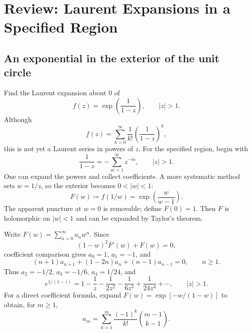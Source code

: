 \documentclass[11pt,a4paper]{article}
\theoremstyle{definition}
\theoremstyle{plain}
\begin{document}
\section{Review: Laurent Expansions in a Specified Region}
\subsection{An exponential in the exterior of the unit circle}
Find the Laurent expansion about $0$ of
\begin{equation}\label{eq:04}
f(z)=\exp\left(\frac1{1-z}\right),\qquad |z|>1.
\end{equation}
Although
\begin{equation}\label{eq:05}
f(z)=\sum_{k=0}^{\infty}\frac1{k!}\left(\frac1{1-z}\right)^k,
\end{equation}
this is not yet a Laurent series in powers of $z$. For the specified
region, begin with
\begin{equation}\label{eq:06}
\frac1{1-z}=-\sum_{m=1}^{\infty}z^{-m},\qquad |z|>1.
\end{equation}
One can expand the powers and collect coefficients. A more systematic
method sets $w=1/z$, so the exterior becomes $0<|w|<1$:
\begin{equation}\label{eq:07}
F(w)\coloneqq f(1/w)=\exp\left(\frac w{w-1}\right).
\end{equation}
The apparent puncture at $w=0$ is removable; define $F(0)=1$. Then $F$
is holomorphic on $|w|<1$ and can be expanded by Taylor's theorem.

Write $F(w)=\sum_{n=0}^{\infty}a_nw^n$. Since
\begin{equation}\label{eq:08}
(1-w)^2 F'(w)+F(w)=0,
\end{equation}
coefficient comparison gives $a_0=1$, $a_1=-1$, and
\begin{equation}\label{eq:09}
(n+1)a_{n+1}+(1-2n)a_n+(n-1)a_{n-1}=0,\qquad n\geq1.
\end{equation}
Thus $a_2=-1/2$, $a_3=-1/6$, $a_4=1/24$, and
\begin{equation}\label{eq:10}
\boxed{e^{1/(1-z)}
   =1-\frac1z-\frac1{2z^2}-\frac1{6z^3}
        +\frac1{24z^4}+\cdots,\qquad |z|>1.}
\end{equation}
For a direct coefficient formula, expand
$F(w)=\exp[-w/(1-w)]$ to obtain, for $m\geq1$,
\begin{equation}\label{eq:11}
a_m=\sum_{k=1}^{m}\frac{(-1)^k}{k!}\binom{m-1}{k-1}.
\end{equation}
\end{document}
